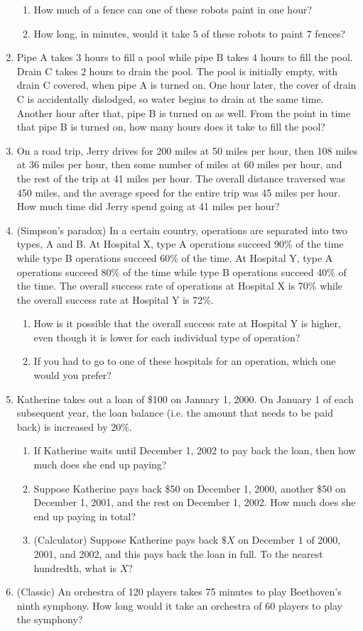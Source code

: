 \documentclass{article}
\begin{document}
\begin{enumerate}
\begin{enumerate}
\item How much of a fence can one of these robots paint in one hour?
\item How long, in minutes, would it take $5$ of these robots to paint $7$ fences?
\end{enumerate}
\item Pipe A takes $3$ hours to fill a pool while pipe B takes $4$ hours to fill the pool. Drain C takes $2$ hours to drain the pool. The pool is initially empty, with drain C covered, when pipe A is turned on. One hour later, the cover of drain C is accidentally dislodged, so water begins to drain at the same time. Another hour after that, pipe B is turned on as well. From the point in time that pipe B is turned on, how many hours does it take to fill the pool?
\item On a road trip, Jerry drives for 200 miles at 50 miles per hour, then 108 miles at 36 miles per hour, then some number of miles at 60 miles per hour, and the rest of the trip at 41 miles per hour. The overall distance traversed was 450 miles, and the average speed for the entire trip was 45 miles per hour. How much time did Jerry spend going at 41 miles per hour?
\item (Simpson's paradox) In a certain country, operations are separated into two types, A and B. At Hospital X, type A operations succeed 90\% of the time while type B operations succeed 60\% of the time. At Hospital Y, type A operations succeed 80\% of the time while type B operations succeed 40\% of the time. The overall success rate of operations at Hospital X is 70\% while the overall success rate at Hospital Y is 72\%.
\begin{enumerate}
\item How is it possible that the overall success rate at Hospital Y is higher, even though it is lower for each individual type of operation?
\item If you had to go to one of these hospitals for an operation, which one would you prefer?
\end{enumerate}
\item Katherine takes out a loan of \$100 on January 1, 2000. On January 1 of each subsequent year, the loan balance (i.e. the amount that needs to be paid back) is increased by 20\%.
\begin{enumerate}
\item If Katherine waits until December 1, 2002 to pay back the loan, then how much does she end up paying?
\item Suppose Katherine pays back \$50 on December 1, 2000, another \$50 on December 1, 2001, and the rest on December 1, 2002. How much does she end up paying in total? 
\item (Calculator) Suppose Katherine pays back $\$X$ on December 1 of 2000, 2001, and 2002, and this pays back the loan in full. To the nearest hundredth, what is $X$?
\end{enumerate}
\item (Classic) An orchestra of 120 players takes 75 minutes to play Beethoven's ninth symphony. How long would it take an orchestra of 60 players to play the symphony?
\end{enumerate}
\end{document}
